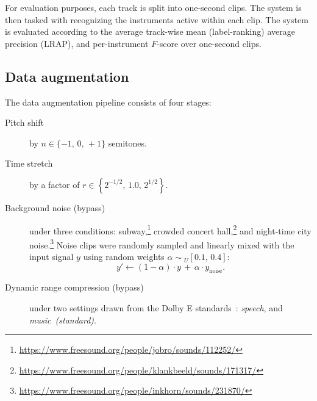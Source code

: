 \documentclass{article}
\begin{document}
For evaluation purposes, each track is split into one-second clips.
The system is then tasked with recognizing the instruments active within each clip.
The system is evaluated according to the average track-wise mean (label-ranking) average
precision (LRAP), and per-instrument $F$-score over one-second clips.

\subsection{Data augmentation}

The data augmentation pipeline consists of four stages:

\begin{description}
    \item[Pitch shift] by $n \in \{-1,\, 0,\, +1\}$ semitones.
    \item[Time stretch] by a factor of $r \in \left\{ 2^{-1/2},\, 1.0,\, 2^{1/2}\right\}$.
    \item[Background noise (bypass)] under three conditions:
        subway,\footnote{\url{https://www.freesound.org/people/jobro/sounds/112252/}}
        crowded concert hall,\footnote{\url{https://www.freesound.org/people/klankbeeld/sounds/171317/}}
        and night-time city noise.\footnote{\url{https://www.freesound.org/people/inkhorn/sounds/231870/}}
        Noise clips were randomly sampled and linearly mixed with the input signal $y$ using random weights
        $\alpha \sim { }_U[0.1,\, 0.4]$:
        \[
            y' \leftarrow (1-\alpha) \cdot y \,+ \, \alpha \cdot y_\text{noise}.
        \]
    \item[Dynamic range compression (bypass)] under two settings drawn from the {Dolby E}
        standards~\cite{dolbyE}: \emph{speech},
        and \emph{music~(standard)}.
\end{description}
\end{document}
